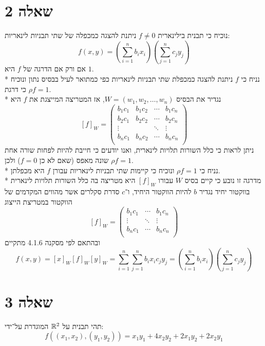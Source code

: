\section{שאלה 2}
נוכיח כי תבנית בילינארית $f \ne 0$ ניתנת להצגה כמכפלה של שתי תבניות לינאריות:
\[
	f(x, y) = \left( \sum_{i = 1}^n b_i x_i \right) \left(\sum_{j = 1}^n c_j y_j \right)
\]
אם ורק אם הדרגה של $f$ היא $1$. \\*
נניח כי $f$ ניתנת להצגה כמכפלת שתי תבניות לינאריות כפי כמתואר לעיל בבסיס נתון ונוכיח כי דרגת $\rho f = 1$. \\*
נגדיר את הבסיס $W = (w_1, w_2, \hdots, w_n)$, אז המטריצה המייצגת את $f$ היא
\[
	{[f]}_W = \begin{pmatrix}
		b_1 c_1 & b_1 c_2 & \cdots & b_1 c_n \\
		b_2 c_1 & b_2 c_2 & \cdots & b_2 c_n \\
		\vdots & & \ddots & \vdots \\
		b_n c_1 & b_n c_2 & \cdots & b_n c_n \\
	\end{pmatrix}
\]
ניתן לראות כי כלל השורות תלויות לינארית, ואנו יודעים כי חייבת להיות לפחות שורה אחת שונה מאפס (שאם לא כן $f = 0$) ולכן $\rho f = 1$. \\*
נניח כי $\rho f = 1$ ונוכיח כי קיימות שתי תבניות לינאריות עבורן $f$ היא מכפלתן. \\*
מדרגה זו נובע כי קיים בסיס $W$ עבורו ${[f]}_W$ היא מטריצה בה כלל השורות תלויות לינארית בווקטור יחיד
נגדיר $b$ להיות הווקטור היחיד, ו־$c$ סדרת סקלרים אשר מהווים המקדמים של הווקטור במטריצת הייצוג
\[
	{[f]}_W = \begin{pmatrix}
		b_1 c_1 & \cdots & b_1 c_n \\
		\vdots & \ddots & \vdots \\
		b_n c_1 & \cdots & b_n c_n \\
	\end{pmatrix}
\]
ובהתאם לפי מסקנה 4.1.6 מתקיים
\[
	f(x, y)
	= {[x]}_W {[f]}_W {[y]}_W
	= \sum_{i = 1}^n \sum_{j = 1}^n b_i x_i c_j y_j
	= \left( \sum_{i = 1}^n b_i x_i \right) \left(\sum_{j = 1}^n c_j y_j \right)
\]

\section{שאלה 3}
תהי תבנית על $\mathbb{R}^2$ המוגדרת על־ידי:
\[
	f\left( (x_1, x_2), (y_1, y_2) \right) = x_1 y_1 + 4 x_2 y_2 + 2 x_1 y_2 + 2x_2 y_1
\]

